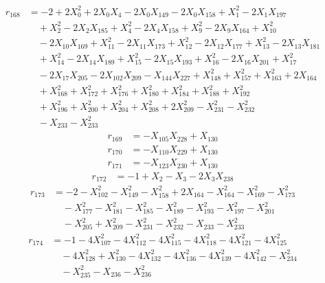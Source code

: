 \begin{align*}
r_{168}&=-2+2X_{0}^{2}+2X_{0}X_{4}-2X_{0}X_{149}-2X_{0}X_{158}+X_{1}^{2}-2X_{1}X_{197}\\
&\quad +X_{2}^{2}-2X_{2}X_{185}+X_{4}^{2}-2X_{4}X_{158}+X_{9}^{2}-2X_{9}X_{164}+X_{10}^{2}\\
&\quad -2X_{10}X_{169}+X_{11}^{2}-2X_{11}X_{173}+X_{12}^{2}-2X_{12}X_{177}+X_{13}^{2}-2X_{13}X_{181}\\
&\quad +X_{14}^{2}-2X_{14}X_{189}+X_{15}^{2}-2X_{15}X_{193}+X_{16}^{2}-2X_{16}X_{201}+X_{17}^{2}\\
&\quad -2X_{17}X_{205}-2X_{102}X_{209}-X_{144}X_{227}+X_{148}^{2}+X_{157}^{2}+X_{163}^{2}+2X_{164}\\
&\quad +X_{168}^{2}+X_{172}^{2}+X_{176}^{2}+X_{180}^{2}+X_{184}^{2}+X_{188}^{2}+X_{192}^{2}\\
&\quad +X_{196}^{2}+X_{200}^{2}+X_{204}^{2}+X_{208}^{2}+2X_{209}^{2}-X_{231}^{2}-X_{232}^{2}\\
&\quad -X_{233}-X_{233}^{2}
\end{align*}
\begin{align*}
r_{169}&=-X_{105}X_{228}+X_{130}
\end{align*}
\begin{align*}
r_{170}&=-X_{110}X_{229}+X_{130}
\end{align*}
\begin{align*}
r_{171}&=-X_{123}X_{230}+X_{130}
\end{align*}
\begin{align*}
r_{172}&=-1+X_{2}-X_{3}-2X_{3}X_{238}
\end{align*}
\begin{align*}
r_{173}&=-2-X_{102}^{2}-X_{149}^{2}-X_{158}^{2}+2X_{164}-X_{164}^{2}-X_{169}^{2}-X_{173}^{2}\\
&\quad -X_{177}^{2}-X_{181}^{2}-X_{185}^{2}-X_{189}^{2}-X_{193}^{2}-X_{197}^{2}-X_{201}^{2}\\
&\quad -X_{205}^{2}+X_{209}^{2}-X_{231}^{2}-X_{232}^{2}-X_{233}-X_{233}^{2}
\end{align*}
\begin{align*}
r_{174}&=-1-4X_{107}^{2}-4X_{112}^{2}-4X_{115}^{2}-4X_{118}^{2}-4X_{121}^{2}-4X_{125}^{2}\\
&\quad -4X_{128}^{2}+X_{130}^{2}-4X_{132}^{2}-4X_{136}^{2}-4X_{139}^{2}-4X_{142}^{2}-X_{234}^{2}\\
&\quad -X_{235}^{2}-X_{236}-X_{236}^{2}
\end{align*}
\endgroup
